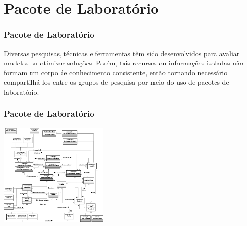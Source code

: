 \documentclass[aspectratio=169]{beamer}
\begin{document}
\section{Pacote de Laboratório}

\begin{frame}
\frametitle{Pacote de Laboratório}
\justifying

Diversas pesquisas, técnicas e ferramentas têm sido desenvolvidos para avaliar modelos ou otimizar soluções. Porém, tais recursos ou informações isoladas não formam um corpo de conhecimento consistente, então tornando necessário compartilhá-los entre os grupos de pesquisa por meio do uso de
pacotes de laboratório.

\end{frame}

\begin{frame}
\frametitle{Pacote de Laboratório}
\justifying

\begin{center}
\includegraphics[width=0.4\textwidth]{onto.png}
\end{center}

\end{frame}

   
   


\end{document}
